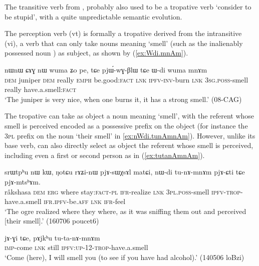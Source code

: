  The transitive verb  from , probably also used to be a tropative verb `consider to be stupid', with a quite unpredictable semantic evolution.

The perception verb  (vt) is formally a tropative derived from the intransitive  (vi), a verb that can only take nouns meaning `smell' (such as the inalienably possessed noun ) as subject, as shown by (\ref{ex:Wdi.mnAm}).

\begin{exe}
\ex \label{ex:Wdi.mnAm}
\gll nɯnɯ ɕɤɣ nɯ wuma ʑo pe, tɕe pjɯ́-wɣ-βlɯ tɕe ɯ-di wuma mnɤm \\
\textsc{dem} juniper \textsc{dem} really \textsc{emph} be.good:\textsc{fact} \textsc{lnk} \textsc{ipfv}-\textsc{inv}-burn \textsc{lnk} \textsc{3sg}.\textsc{poss}-smell really have.a.smell:\textsc{fact} \\
\glt `The juniper is very nice, when one burns it, it has a strong smell.' (08-CAG)
\end{exe}

The tropative  can take as object a noun meaning `smell', with the referent whose smell is perceived encoded as a possessive prefix on the object (for instance the \textsc{3pl} prefix on the noun  `their smell' in \ref{ex:nWdi.tunAmnAm}). However, unlike its base verb,  can also directly select as object the referent whose smell is perceived, including even a first or second person as in (\ref{ex:tutanAmnAm}).

\begin{exe}
\ex \label{ex:nWdi.tunAmnAm}
\gll srɯtpʰu nɯ kɯ, ŋotɕu rɤʑi-nɯ pjɤ-sɯχsɤl matɕi, nɯ-di tu-nɤ-mnɤm pjɤ-ɕti tɕe pjɤ-mtsʰɤm. \\
râkshasa \textsc{dem} \textsc{erg} where stay:\textsc{fact}-\textsc{pl} \textsc{ifr}-realize \textsc{lnk} \textsc{3pl}.\textsc{poss}-smell \textsc{ipfv}-\textsc{trop}-have.a.smell \textsc{ifr}.\textsc{ipfv}-be.\textsc{aff} \textsc{lnk} \textsc{ifr}-feel \\
\glt `The ogre realized where they where, as it was sniffing them out and perceived [their smell].' (160706 poucet6)
\end{exe}


\begin{exe}
\ex \label{ex:tutanAmnAm}
\gll  jɤ-ɣi tɕe, pɤjkʰu tu-ta-nɤ-mnɤm \\
\textsc{imp}-come \textsc{lnk} still \textsc{ipfv}:\textsc{up}-1\fl{}2-\textsc{trop}-have.a.smell \\
\glt `Come (here), I will smell you (to see if you have had alcohol).' (140506 loBzi)
\end{exe}

